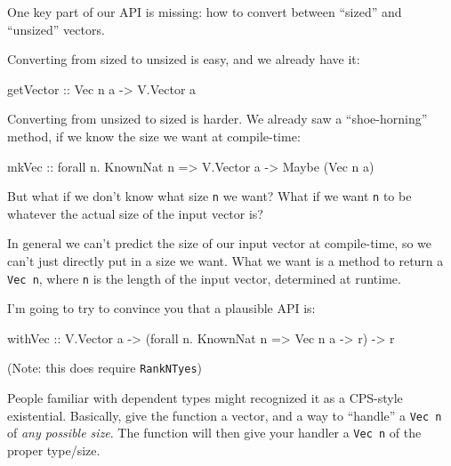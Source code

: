 \documentclass[]{article}
\newenvironment{Shaded}{}{}
\newcommand{\DataTypeTok}[1]{\textcolor[rgb]{0.56,0.13,0.00}{#1}}
\newcommand{\OtherTok}[1]{\textcolor[rgb]{0.00,0.44,0.13}{#1}}
\newcommand{\FunctionTok}[1]{\textcolor[rgb]{0.02,0.16,0.49}{#1}}
\newcommand{\NormalTok}[1]{#1}
\begin{document}
One key part of our API is missing: how to convert between ``sized'' and
``unsized'' vectors.

Converting from sized to unsized is easy, and we already have it:

\begin{Shaded}
\begin{Highlighting}[]
\OtherTok{getVector ::} \DataTypeTok{Vec}\NormalTok{ n a }\OtherTok{->} \DataTypeTok{V.Vector}\NormalTok{ a}
\end{Highlighting}
\end{Shaded}

Converting from unsized to sized is harder. We already saw a ``shoe-horning''
method, if we know the size we want at compile-time:

\begin{Shaded}
\begin{Highlighting}[]
\OtherTok{mkVec ::}\NormalTok{ forall n}\FunctionTok{.} \DataTypeTok{KnownNat}\NormalTok{ n }\OtherTok{=>} \DataTypeTok{V.Vector}\NormalTok{ a }\OtherTok{->} \DataTypeTok{Maybe}\NormalTok{ (}\DataTypeTok{Vec}\NormalTok{ n a)}
\end{Highlighting}
\end{Shaded}

But what if we don't know what size \texttt{n} we want? What if we want
\texttt{n} to be whatever the actual size of the input vector is?

In general we can't predict the size of our input vector at compile-time, so we
can't just directly put in a size we want. What we want is a method to return a
\texttt{Vec\ n}, where \texttt{n} is the length of the input vector, determined
at runtime.

I'm going to try to convince you that a plausible API is:

\begin{Shaded}
\begin{Highlighting}[]
\NormalTok{withVec}
\OtherTok{    ::} \DataTypeTok{V.Vector}\NormalTok{ a}
    \OtherTok{->}\NormalTok{ (forall n}\FunctionTok{.} \DataTypeTok{KnownNat}\NormalTok{ n }\OtherTok{=>} \DataTypeTok{Vec}\NormalTok{ n a }\OtherTok{->}\NormalTok{ r)}
    \OtherTok{->}\NormalTok{ r}
\end{Highlighting}
\end{Shaded}

(Note: this does require \texttt{RankNTyes})

People familiar with dependent types might recognized it as a CPS-style
existential. Basically, give the function a vector, and a way to ``handle'' a
\texttt{Vec\ n} of \emph{any possible size}. The function will then give your
handler a \texttt{Vec\ n} of the proper type/size.
\end{document}
